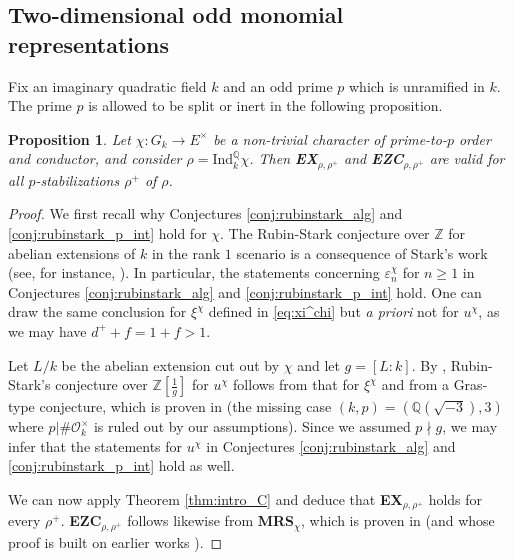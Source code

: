 \documentclass[12pt]{amsart}
\newcommand\bZ{\mathbb{Z}}
\newcommand\bQ{\mathbb{Q}}
\newcommand\cO{\mathcal{O}}
\newcommand{\Ind}{\mathrm{Ind}}
\DeclareMathOperator{\Gal}{Gal}
\theoremstyle{defstyle}
\theoremstyle{thmstyle}
\newtheorem{proposition}[subsubsection]{Proposition}
\begin{document}
\subsection{Two-dimensional odd monomial representations}\label{sec:example_odd_monomial}
Fix an imaginary quadratic field $k$ and an odd prime $p$ which is unramified in $k$. The prime $p$ is allowed to be split or inert in the following proposition.
\begin{proposition}\label{prop:iqf_inert_and_split}
Let $\chi:G_k\longrightarrow E^\times$ be a non-trivial character of prime-to-$p$ order and conductor, and consider $\rho=\Ind_k^\bQ \chi$. Then \textbf{EX}$_{\rho,\rho^+}$ and \textbf{EZC}$_{\rho,\rho^+}$ are valid for all $p$-stabilizations $\rho^+$ of $\rho$.
\end{proposition}
\begin{proof}
We first recall why Conjectures \ref{conj:rubinstark_alg} and \ref{conj:rubinstark_p_int} hold for $\chi$. The Rubin-Stark conjecture over $\bZ$ for abelian extensions of $k$ in the rank $1$ scenario is a consequence of Stark's work (see, for instance, \cite[Chap. IV, Prop. 3.9]{tate}). In particular, the statements concerning $\varepsilon_n^\chi$ for $n\geq 1$ in Conjectures \ref{conj:rubinstark_alg} and \ref{conj:rubinstark_p_int} hold. One can draw the same conclusion for $\xi^\chi$ defined in \eqref{eq:xi^chi} but \emph{a priori} not for $u^\chi$, as we may have $d^++f=1+f>1$. 

Let $L/k$ be the abelian extension cut out by $\chi$ and let $g=[L:k]$. By \cite[Coro. 5.4]{rubinstark}, Rubin-Stark's conjecture over $\bZ[\frac{1}{g}]$ for $u^\chi$ follows from that for $\xi^\chi$ and from a Gras-type conjecture, which is proven in \cite[Thm. 1]{rubinmore} (the missing case $(k,p)=(\bQ(\sqrt{-3}),3)$ where $p|\#\cO_k^\times$ is ruled out by our assumptions). Since we assumed $p\nmid g$, we may infer that the statements for $u^\chi$ in Conjectures \ref{conj:rubinstark_alg} and \ref{conj:rubinstark_p_int} hold as well.
	
We can now apply Theorem \ref{thm:intro_C} and deduce that \textbf{EX}$_{\rho,\rho^+}$ holds for every $\rho^+$. \textbf{EZC}$_{\rho,\rho^+}$ follows likewise from \textbf{MRS}$_\chi$, which is proven in \cite[Thm. A]{bullachhofer} (and whose proof is built on earlier works \cite{bleyeTNC,bleyhofer}).
\end{proof}
\end{document}
